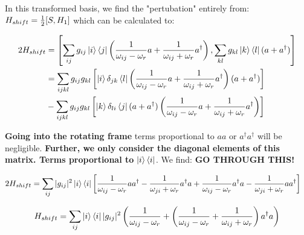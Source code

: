 In this transformed basis, we find the "pertubation" entirely from: $H_{shift} = \frac12 \comm{S}{H_1}$ which can be calculated to:
\begin{fullwidth}
\begin{align*}
    2 H_{shift}&= \comm{\sum_{ij}g_{ij}\ket{i}\bra{j}\left(\frac{1}{\omega_{ij} - \omega_r}a + \frac{1}{\omega_{ij} + \omega_r} a^\dagger \right)}{\sum_{kl} g_{kl} \ket{k}\bra{l} (a + a^\dagger ) } \\
    &= \sum_{ijkl} g_{ij} g_{kl}\left[\ket{i}\delta_{jk}\bra{l}\left(\frac{1}{\omega_{ij} - \omega_r}a + \frac{1}{\omega_{ij} + \omega_r} a^\dagger \right)(a + a^\dagger)\right]\\
    &- \sum_{ijkl} g_{ij} g_{kl}\left[\ket{k} \delta_{li}\bra{j} (a + a^\dagger)\left(\frac{1}{\omega_{ij} - \omega_r}a + \frac{1}{\omega_{ij} + \omega_r} a^\dagger\right)\right]
\end{align*}
\end{fullwidth}
\textbf{Going into the rotating frame} terms proportional to $aa$ or $a^\dagger a^\dagger$ will be negligible. \textbf{Further, we only consider the diagonal elements of this matrix. Terms proportional to} $\ket{i}\bra{i}$. We find: \textbf{GO THROUGH THIS!}
\begin{fullwidth}
\begin{align*}
    2 H_{shift} &= \sum_{ij} |g_{ij}|^2 \ket{i}\bra{i} \left[\frac{1}{\omega_{ij} - \omega_r}aa^\dagger - \frac{1}{\omega_{ji} + \omega_r} a^\dagger a + \frac{1}{\omega_{ij} - \omega_r}a^\dagger a - \frac{1}{\omega_{ji} + \omega_r}  a a^\dagger  \right]
\end{align*}
\end{fullwidth}

\begin{fullwidth}
\begin{equation}
    H_{shift} = \sum_{ij} \ket{i}\bra{i} |g_{ij}|^2 \left(\frac{1}{\omega_{ij} - \omega_r} + \left(\frac{1}{\omega_{ij} - \omega_r} + \frac{1}{\omega_{ij} + \omega_r} \right)a^\dagger a\right)
\end{equation}
\end{fullwidth}

